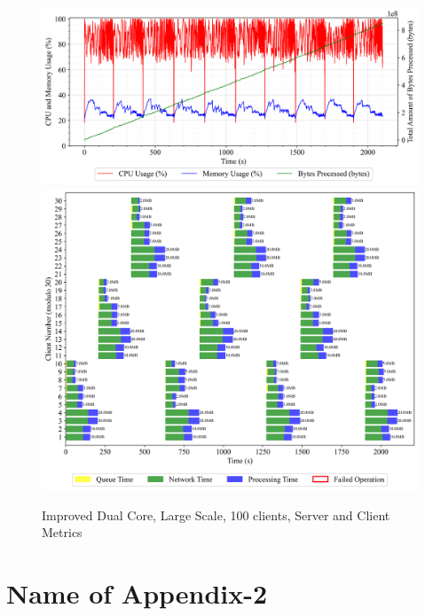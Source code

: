 \newpage
\begin{figure}[h!t]
    \begin{center}
    \label{Fig:A1.20}
    \caption{Improved Dual Core, Large Scale, 100 clients, Server and Client Metrics}
    \includegraphics[width=\xLarge\textwidth]{Chapter4/Results/2c_improved_results/arty-a7-2c-improved_large_scale_1000_20241007_123418.db_server_metrics.png}
    \includegraphics[width=\xLarge\textwidth]{Chapter4/Results/2c_improved_results/arty-a7-2c-improved_large_scale_1000_20241007_123418.db_client_tasks.png}
    \end{center}
\end{figure}

\newpage
\section{Name of Appendix-2}



